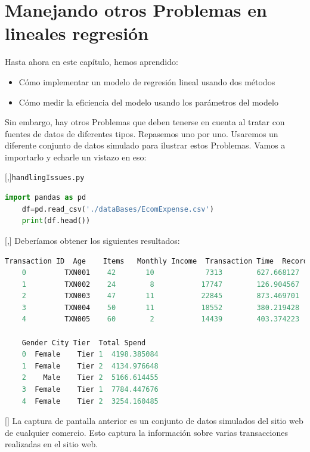 \section{Manejando otros Problemas en lineales regresión}

Hasta ahora en este capítulo, hemos aprendido:
\begin{itemize}
	\item Cómo implementar un modelo de regresión lineal usando dos métodos
	\item Cómo medir la eficiencia del modelo usando los parámetros del modelo
\end{itemize}


Sin embargo, hay otros Problemas que deben tenerse en cuenta al tratar con fuentes de datos de diferentes tipos. Repasemos uno por uno. Usaremos un diferente conjunto de datos simulado para ilustrar estos Problemas. Vamos a importarlo y echarle un vistazo
en eso:

[,]{\texttt{handlingIssues.py}}
\begin{lstlisting}[language=Python]
	import pandas as pd
	df=pd.read_csv('./dataBases/EcomExpense.csv')
	print(df.head())
\end{lstlisting}

[,]{}
Deberíamos obtener los siguientes resultados:

\begin{lstlisting}[language=Python]
	Transaction ID  Age    Items   Monthly Income  Transaction Time  Record  \
	0         TXN001    42       10            7313        627.668127       5
	1         TXN002    24        8           17747        126.904567       3
	2         TXN003    47       11           22845        873.469701       2
	3         TXN004    50       11           18552        380.219428       7
	4         TXN005    60        2           14439        403.374223       2
	
	Gender City Tier  Total Spend
	0  Female    Tier 1  4198.385084
	1  Female    Tier 2  4134.976648
	2    Male    Tier 2  5166.614455
	3  Female    Tier 1  7784.447676
	4  Female    Tier 2  3254.160485
\end{lstlisting}

[]{}
La captura de pantalla anterior es un conjunto de datos simulados del sitio web de cualquier comercio. Esto captura la información sobre varias transacciones realizadas en el sitio web.


